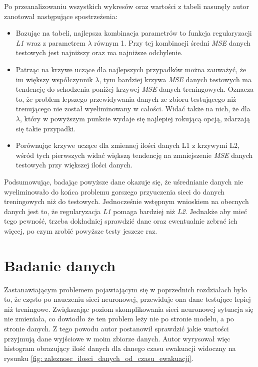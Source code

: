 \documentclass[12pt]{aghdpl}
\begin{document}
		Po przeanalizowaniu wszystkich wykresów oraz wartości z tabeli nasunęły autor zanotował następujące spostrzeżenia:
		\begin{itemize}
		\item Bazując na tabeli, najlepsza kombinacja parametrów to funkcja regularyzacji \textit{L1} wraz z parametrem $\lambda$ równym 1. Przy tej kombinacji średni \textit{MSE} danych testowych jest najniższy oraz ma najniższe odchylenie.
		\item Patrząc na krzywe uczące dla najlepszych przypadków można zauważyć, że im większy współczynnik $\lambda$, tym bardziej krzywa \textit{MSE} danych testowych ma tendencję do schodzenia poniżej krzywej \textit{MSE} danych treningowych. Oznacza to, że problem lepszego przewidywania danych ze zbioru testującego niż trenującego nie został wyeliminowany w całości. Widać także na nich, że dla $\lambda$, który w powyższym punkcie wydaje się najlepiej rokującą opcją, zdarzają się takie przypadki.
		\item Porównując krzywe uczące dla zmiennej ilości danych L1 z krzywymi L2, wśród tych pierwszych widać większą tendencję na zmniejszenie \textit{MSE} danych testowych przy większej ilości danych.
		\end{itemize}				
		
		Podsumowując, badając powyższe dane okazuje się, że uśrednianie danych nie wyeliminowało do końca problemu gorszego przyuczenia sieci do danych treningowych niż do testowych. Jednocześnie wstępnym wnioskiem na obecnych danych jest to, że regularyzacja \textit{L1} pomaga bardziej niż \textit{L2}. Jednakże aby mieć tego pewność, trzeba dokładniej sprawdzić dane oraz ewentualnie zebrać ich więcej, po czym zrobić powyższe testy jeszcze raz.
		
		\section{Badanie danych}
		Zastanawiającym problemem pojawiającym się w poprzednich rozdziałach było to, że często po nauczeniu sieci neuronowej, przewiduje ona dane testujące lepiej niż treningowe. Zwiększając poziom skomplikowania sieci neuronowej sytuacja się nie zmieniała, co dowiodło że ten problem leży nie po stronie modelu, a po stronie danych. Z tego powodu autor postanowił sprawdzić jakie wartości przyjmują dane wyjściowe w moim zbiorze danych. Autor wyrysował więc histogram obrazujący ilość danych dla danego czasu ewakuacji widoczny na rysunku \ref{fig: zaleznosc_ilosci_danych_od_czasu_ewakuacji}.
		
\end{document}
